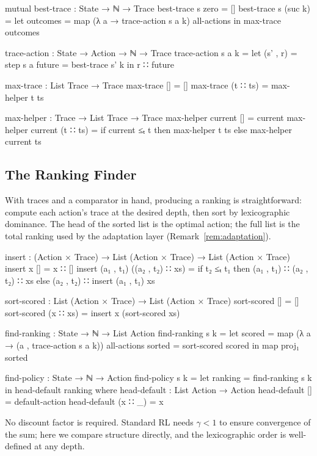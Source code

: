\documentclass[runningheads]{llncs}
\begin{document}
\begin{code}[hide]
  mutual
    best-trace : State → ℕ → Trace
    best-trace s zero    = []
    best-trace s (suc k) =
      let outcomes = map (λ a → trace-action s a k) all-actions
      in max-trace outcomes

    trace-action : State → Action → ℕ → Trace
    trace-action s a k =
      let (s' , r) = step s a
          future   = best-trace s' k
      in r ∷ future

    max-trace : List Trace → Trace
    max-trace []       = []
    max-trace (t ∷ ts) = max-helper t ts

    max-helper : Trace → List Trace → Trace
    max-helper current [] = current
    max-helper current (t ∷ ts) =
      if current ≤ₜ t
      then max-helper t ts
      else max-helper current ts
\end{code}

\subsection{The Ranking Finder}

With traces and a comparator in hand, producing a ranking is straightforward: compute each action's trace at the desired depth, then sort by lexicographic dominance.  The head of the sorted list is the optimal action; the full list is the total ranking used by the adaptation layer (Remark~\ref{rem:adaptation}).

\begin{code}[hide]
  insert : (Action × Trace) → List (Action × Trace) → List (Action × Trace)
  insert x [] = x ∷ []
  insert (a₁ , t₁) ((a₂ , t₂) ∷ xs) =
    if t₂ ≤ₜ t₁
    then (a₁ , t₁) ∷ (a₂ , t₂) ∷ xs
    else (a₂ , t₂) ∷ insert (a₁ , t₁) xs

  sort-scored : List (Action × Trace) → List (Action × Trace)
  sort-scored [] = []
  sort-scored (x ∷ xs) = insert x (sort-scored xs)

  find-ranking : State → ℕ → List Action
  find-ranking s k =
    let scored = map (λ a → (a , trace-action s a k)) all-actions
        sorted = sort-scored scored
    in map proj₁ sorted

  find-policy : State → ℕ → Action
  find-policy s k =
    let ranking = find-ranking s k
    in head-default ranking
    where
      head-default : List Action → Action
      head-default []      = default-action
      head-default (x ∷ _) = x
\end{code}

\noindent No discount factor is required.  Standard RL needs $\gamma < 1$ to ensure convergence of the sum; here we compare structure directly, and the lexicographic order is well-defined at any depth.
\end{document}
